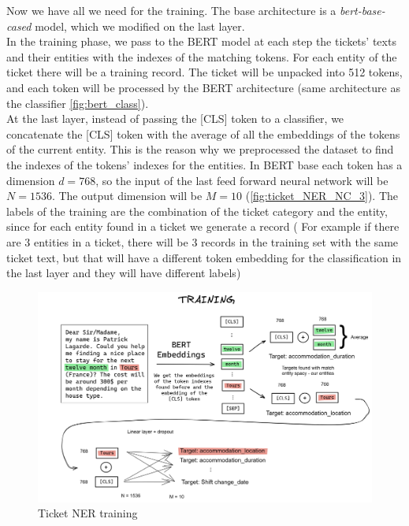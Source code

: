 Now we have all we need for the training. The base architecture is a \textit{bert-base-cased} model, which we modified on the last layer. \\
In the training phase, we pass to the BERT model at each step the tickets' texts and their entities with the indexes of the matching tokens. For each entity of the ticket there will be a training record. The ticket will be unpacked into 512 tokens, and each token will be processed by the BERT architecture (same architecture as the classifier \autoref{fig:bert_class}). \\
At the last layer, instead of passing the [CLS] token to a classifier, we concatenate the [CLS] token with the average of all the embeddings of the tokens of the current entity. This is the reason why we preprocessed the dataset to find the indexes of the tokens' indexes for the entities. In BERT base each token has a dimension $d=768$, so the input of the last feed forward neural network will be $N=1536$. The output dimension will be $M=10$ (\autoref{fig:ticket_NER_NC_3}). The labels of the training are the combination of the ticket category and the entity, since for each entity found in a ticket we generate a record ( For example if there are 3 entities in a ticket, there will be 3 records in the training set with the same ticket text, but that will have a different token embedding for the classification in the last layer and they will have different labels)\\
\begin{figure}[h] 
    \includegraphics[width=\textwidth]{images/NER_nc_3.png}
    \caption{Ticket NER training}
    \label{fig:ticket_NER_NC_3}
\end{figure}   
